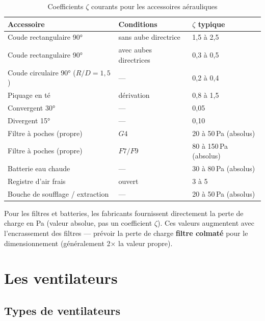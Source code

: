 \begin{table}[H]
  \centering
  \caption{Coefficients $\zeta$ courants pour les accessoires aérauliques}
  \begin{tabular}{lll}
    \toprule
    Accessoire & Conditions & $\zeta$ typique \\
    \midrule
    Coude rectangulaire 90° & sans aube directrice & 1{,}5 à 2{,}5 \\
    Coude rectangulaire 90° & avec aubes directrices & 0{,}3 à 0{,}5 \\
    Coude circulaire 90° ($R/D = 1{,}5$) & — & 0{,}2 à 0{,}4 \\
    Piquage en té & dérivation & 0{,}8 à 1{,}5 \\
    Convergent 30° & — & 0{,}05 \\
    Divergent 15° & — & 0{,}10 \\
    Filtre à poches (propre) & $G4$ & 20 à 50\,Pa (absolus) \\
    Filtre à poches (propre) & $F7/F9$ & 80 à 150\,Pa (absolus) \\
    Batterie eau chaude & — & 30 à 80\,Pa (absolus) \\
    Registre d'air frais & ouvert & 3 à 5 \\
    Bouche de soufflage / extraction & — & 20 à 50\,Pa (absolus) \\
    \bottomrule
  \end{tabular}
\end{table}

\begin{attention}
Pour les filtres et batteries, les fabricants fournissent directement la perte de charge en \si{\pascal} (valeur absolue, pas un coefficient $\zeta$). Ces valeurs augmentent avec l'encrassement des filtres — prévoir la perte de charge \textbf{filtre colmaté} pour le dimensionnement (généralement 2× la valeur propre).
\end{attention}

\section{Les ventilateurs}

\subsection{Types de ventilateurs}

